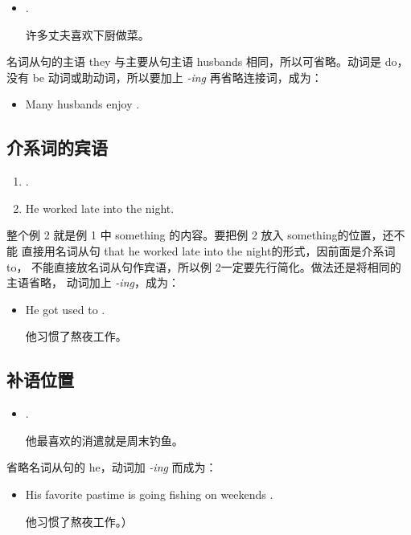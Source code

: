 \begin{itemize}
\item {}  .

  许多丈夫喜欢下厨做菜。
\end{itemize}
名词从句的主语 they 与主要从句主语 husbands 相同，所以可省略。动词是
do，没有 be 动词或助动词，所以要加上 \emph{-ing} 再省略连接词，成为：
\begin{itemize}
\item Many husbands enjoy .
\end{itemize}

\subsection{ 介系词的宾语}

\begin{enumerate}
\item {}    .
\item He worked late into the night.
\end{enumerate}

整个例 2 就是例 1 中 something 的内容。要把例 2 放入 something的位置，还不能
直接用名词从句 that he worked late into the night的形式，因前面是介系词 to，
不能直接放名词从句作宾语，所以例 2一定要先行简化。做法还是将相同的主语省略，
动词加上 \emph{-ing}，成为：

\begin{itemize}
\item He got used to .

  他习惯了熬夜工作。
\end{itemize}

\subsection{补语位置}

\begin{itemize}
\item {}  .

  他最喜欢的消遣就是周末钓鱼。
\end{itemize}
省略名词从句的 he，动词加 \emph{-ing} 而成为：
\begin{itemize}
\item   His favorite pastime is going fishing on weekends .

他习惯了熬夜工作。）
\end{itemize}

